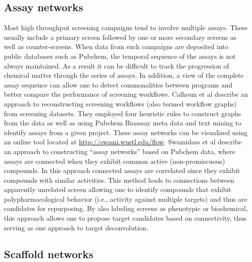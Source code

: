 \documentclass[]{book}
\begin{document}
\subsection{Assay networks}
\label{sec:assay-networks}

Most high throughput screening campaigns tend to involve multiple
assays. These usually include a primary screen followed by one or more
secondary screens as well as counter-screens. When data from such
campaigns are deposited into public databases such as Pubchem, the
temporal sequence of the assays is not always maintained. As a result
it can be difficult to track the progression of chemical matter
through the series of assays. In addition, a view of the complete
assay sequence can allow one to detect commonalities between programs
and better compare the performance of screening workflows. Calhoun et
al \cite{Calhoun:2012uq} describe an approach to reconstructing
screening workflows (also termed workflow graphs) from screening
datasets. They employed four heuristic rules to construct graphs from
the data as well as using Pubchem Bioassay meta data and text mining
to identify assays from a given project. These assay networks can be
visualized using an online tool located at
\href{http://swami.wustl.edu/flow}{http://swami.wustl.edu/flow}.
Swamidass et al \cite{Swamidass:2014vn} describe an approach to
constructing ``assay networks'' based on Pubchem data, where assays
are connected when they exhibit common active (non-promiscuous)
compounds. In this approach connected assays are correlated since they
exhibit compounds with similar activities. This method leads to
connections between apparently unrelated screen allowing one to
identify compounds that exhibit polypharmacological behavior (i.e.,
activity against multiple targets) and thus are candidates for
repurposing. By also labeling screens as phenotypic or biochemical,
this approach allows one to propose target candidates based on
connectivity, thus serving as one approach to target deconvolution.

\subsection{Scaffold networks}
\label{sec:scaffold-networks}
\end{document}
